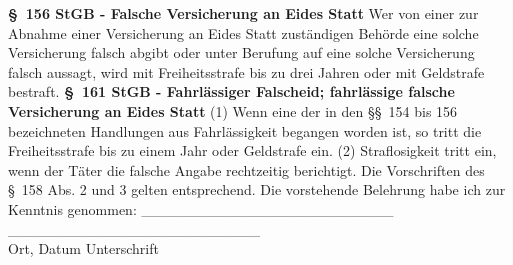 \newline
\textbf{\S\ 156 StGB - Falsche Versicherung an Eides Statt}\newline
Wer von einer zur Abnahme einer Versicherung an Eides Statt zuständigen Behörde eine solche Versicherung falsch abgibt oder unter Berufung auf eine solche Versicherung falsch aussagt, wird mit Freiheitsstrafe bis zu drei Jahren oder mit Geldstrafe bestraft.\newline
\textbf{\S\ 161 StGB - Fahrlässiger Falscheid; fahrlässige falsche Versicherung an Eides Statt}
(1) Wenn eine der in den \S\S\ 154 bis 156 bezeichneten Handlungen aus Fahrlässigkeit begangen worden ist, so tritt die Freiheitsstrafe bis zu einem Jahr oder Geldstrafe ein.
(2) Straflosigkeit tritt ein, wenn der Täter die falsche Angabe rechtzeitig berichtigt. Die Vorschriften des \S\ 158 Abs. 2 und 3 gelten entsprechend.\newline
\newline
Die vorstehende Belehrung habe ich zur Kenntnis genommen:\newline
\newline
\_\_\_\_\_\_\_\_\_\_\_\_\_\_\_\_\_\_\_\_\_\_\_\_ \hspace{1.5cm} \_\_\_\_\_\_\_\_\_\_\_\_\_\_\_\_\_\_\_\_\_\_\_\_ \\
\small{Ort, Datum}\hspace{4.8cm}
\small{Unterschrift}
